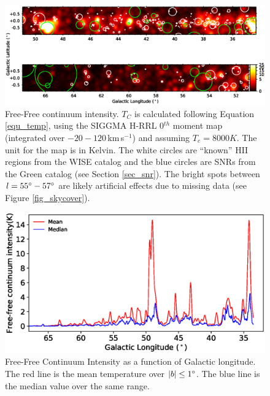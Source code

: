 \documentclass[manuscript]{aastex61}
\newcommand{\kms}{\,km\,s$^{-1}$}
\begin{document}
\begin{figure}[htbp]
\centering
\includegraphics[width = 7in]{temperature_thermal_map.eps}
\caption{Free-Free continuum intensity. $T_{C}$ is calculated following Equation \ref{equ_temp}, using the SIGGMA H-RRL 0$^{th}$ moment map (integrated over $-20 - 120$\kms) and assuming $T_e = 8000 K$. The unit for the map is in Kelvin. The white circles are ``known'' HII regions from the WISE catalog and the blue circles are SNRs from the Green catalog (see Section \ref{sec_snr}). The bright spots between $l=55\mbox{$^\circ$}-57\mbox{$^\circ$}$ are likely artificial effects due to missing data (see Figure \ref{fig_skycover}).}
\label{fig_gal_free}
\end{figure}
\begin{figure}[bhpt]
\centering
\includegraphics[width = 6in]{temperature_thermal_plot.eps}
\caption{Free-Free Continuum Intensity as a function of Galactic longitude. The red line is the mean temperature over $|b|\le 1\mbox{$^\circ$}$. The blue line is the median value over the same range.}
\label{fig_gal_plot}
\end{figure}
\end{document}
